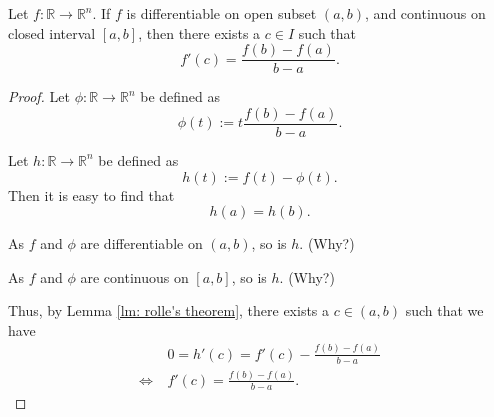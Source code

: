 \begin{lemma}
	\label{lm: directional derivatives: mean value theorem: real valued function}
	
	Let $f: \mathbb R \to \mathbb R^n$. If $f$ is differentiable on open subset $(a,b)$, and continuous on closed interval $[a,b]$, then there exists a $c \in I$ such that
	$$
	f'(c) = \frac{f(b) - f(a)}{b - a}.
	$$
	
	\begin{proof}
		Let $\phi: \mathbb R \to \mathbb R^n$ be defined as
		$$
		\phi(t) := t \frac{f(b)-f(a)}{b-a}.
		$$
	
		Let $h: \mathbb R \to \mathbb R^n$ be defined as
		$$
		h(t) := f(t) - \phi(t).
		$$
		Then it is easy to find that
		$$
		h(a) = h(b).
		$$
		
		As $f$ and $\phi$ are differentiable on $(a,b)$, so is $h$. (Why?)
		
		As $f$ and $\phi$ are continuous on $[a,b]$, so is $h$. (Why?)
		
		Thus, by Lemma \ref{lm: rolle's theorem}, there exists a $c \in (a,b)$ such that we have
		$$
		\begin{aligned}
			& \ 0 = h'(c) = f'(c) - \frac{f(b) - f(a)}{b - a} \\
			\iff & \ f'(c) = \frac{f(b) - f(a)}{b - a}.
		\end{aligned}
		$$
		
	\end{proof}
\end{lemma}



